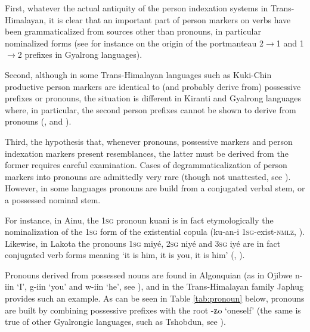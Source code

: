 \documentclass[oldfontcommands,oneside,a4paper,11pt]{article}
\newcommand{\ipa}[1]{{\phon \mbox{#1}}} %
\begin{document}
First, whatever the actual antiquity of the person indexation systems in Trans-Himalayan, it is clear that an important part of person markers on verbs have been grammaticalized from sources other than pronouns, in particular nominalized forms (see for instance \citealt{jacques15generic} on the origin of the portmanteau 2$\rightarrow$1 and 1$\rightarrow$2 prefixes in Gyalrong languages).

Second, although in some Trans-Himalayan languages such as Kuki-Chin productive person markers are identical to (and probably derive from) possessive prefixes or pronouns, the situation is different in Kiranti and Gyalrong languages where, in particular, the second person prefixes cannot be shown to derive from pronouns (\citealt{jacques12agreement}, \citealt{delancey11prefixes} and \citealt{delancey14second}).

Third, the hypothesis that, whenever pronouns, possessive markers and person indexation markers present resemblances, the latter must be derived from the former requires careful examination.  Cases of degrammaticalization of person markers into pronouns are admittedly very rare (though not unattested, see \citealt{norde09degrammaticalization, hyman11macrosudan}). However, in some languages pronouns are build from a conjugated verbal stem, or a possessed nominal stem. 
 

For instance, in Ainu, the \textsc{1sg} pronoun \ipa{kuani} is in fact etymologically the nominalization of the \textsc{1sg} form of the existential copula (\ipa{ku-an-i} \textsc{1sg}-exist-\textsc{nmlz}, \citealt[31]{shibatani90japan}). Likewise, in Lakota the pronouns \textsc{1sg} \ipa{miyé}, \textsc{2sg} \ipa{niyé} and \textsc{3sg} \ipa{iyé} are in fact conjugated verb forms meaning `it is him, it is you, it is him' (\citealt{deloria41}, \citealt[707;754]{ullrich08}). 

Pronouns derived from possessed nouns are found in Algonquian (as in Ojibwe \ipa{n-iin} `I', \ipa{g-iin} `you' and \ipa{w-iin} `he', see \citealt{valentine01grammar}), and in the Trans-Himalayan family Japhug provides such an example. As can be seen in Table \ref{tab:pronoun} below, pronouns are built by combining possessive prefixes with the root \ipa{-ʑo} `oneself' (the same is true of other Gyalrongic languages, such as Tshobdun, see \citealt[113]{jackson98morphology}).
\end{document}

